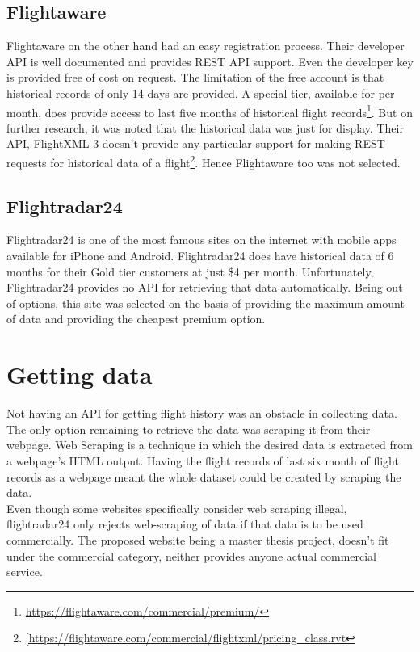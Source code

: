 \subsection{Flightaware}
Flightaware on the other hand had an easy registration process. Their developer API is well documented and provides REST API support. Even the developer key is provided free of cost on request. The limitation of the free account is that historical records of only 14 days are provided. A special tier, available for  per month, does provide access to last five months of historical flight records\footnote{\url{https://flightaware.com/commercial/premium/}}. But on further research, it was noted that  the historical data was just for display. Their API, FlightXML 3 doesn't provide any particular support for making REST requests for historical data of a flight\footnote{\url{[https://flightaware.com/commercial/flightxml/pricing_class.rvt}}. Hence Flightaware too was not selected.

\subsection{Flightradar24}
Flightradar24 is one of the most famous sites on the internet with mobile apps available for iPhone and Android. Flightradar24 does have historical data of 6 months for their Gold tier customers at just \$4 per month. Unfortunately, Flightradar24 provides no API for retrieving that data automatically. Being out of options, this site was selected on the basis of providing the maximum amount of data and providing the cheapest premium option.

\section{Getting data}
Not having an API for getting flight history was an obstacle in collecting data. The only option remaining to retrieve the data was scraping it from their webpage. Web Scraping is a technique in which the desired data is extracted from a webpage's HTML output. Having the flight records of last six month of flight records as a webpage meant the whole dataset could be created by scraping the data.
\\Even though some websites specifically consider web scraping illegal\cite{Hirschey2014SymbioticScraping}, flightradar24 only rejects web-scraping of data if that data is to be used commercially. The proposed website being a master thesis project, doesn't fit under the commercial category, neither provides anyone actual commercial service. 

